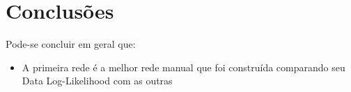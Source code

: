 \section{Conclusões}
	Pode-se concluir em geral que:\\
	\begin{itemize}
		\item A primeira rede é a melhor rede manual que foi construída comparando seu Data Log-Likelihood com as outras
	\end{itemize}

\clearpage